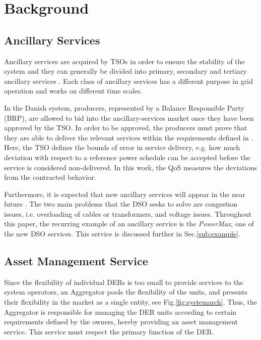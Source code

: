 \section{Background} \label{sec:method}

	\subsection{Ancillary Services} %
	\label{sub:ancillary}
	Ancillary services are acquired by TSOs in order to ensure the stability of the system and they can generally be divided into primary, secondary and tertiary ancillary services \cite{Rebours}. Each class of ancillary services has a different purpose in grid operation and works on different time scales.

	In the Danish system, producers, represented by a Balance Responsible Party (BRP), are allowed to bid into the ancillary-services market once they have been approved by the TSO. In order to be approved, the producers must prove that they are able to deliver the relevant services within the requirements defined in \cite{EnerginetAncillary,bondy2013}. Here, the TSO defines the bounds of error in service delivery, e.g. how much deviation with respect to a reference power schedule can be accepted before the service is considered non-delivered. In this work, the QoS measures the deviations from the contracted behavior.

	Furthermore, it is expected that new ancillary services will appear in the near future \cite{ipower2013development}. The two main problems that the DSO seeks to solve are congestion issues, i.e. overloading of cables or transformers, and voltage issues. Throughout this paper, the recurring example of an ancillary service is the \emph{PowerMax}, one of the new DSO services. This service is discussed further in Sec.\ref{sub:example}.
	
	\subsection{Asset Management Service} %
	\label{sub:asset}
	Since the flexibility of individual DERs is too small to provide services to the system operators, an Aggregator pools the flexibility of the units, and presents their flexibility in the market as a single entity, see Fig.\ref{fig:systemarch}. Thus, the Aggregator is responsible for managing the DER units according to certain requirements defined by the owners, hereby providing an asset management service. This service must respect the primary function of the DER. 
	

